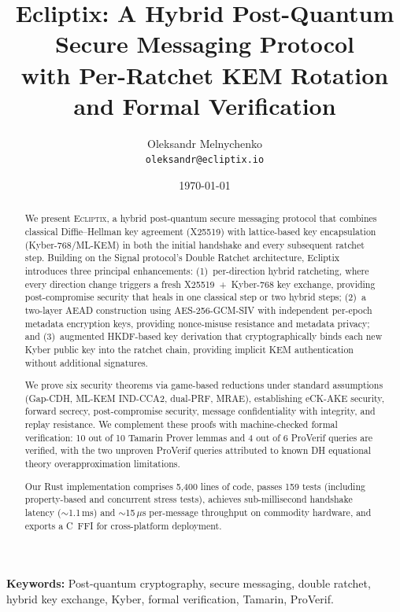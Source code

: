 \documentclass[11pt,a4paper]{article}
\title{\textbf{Ecliptix: A Hybrid Post-Quantum Secure Messaging Protocol\\with Per-Ratchet KEM Rotation and Formal Verification}}
\author{%
  Oleksandr Melnychenko\\
  \texttt{oleksandr@ecliptix.io}
}
\date{\today}
\theoremstyle{definition}
\begin{document}
\maketitle

\begin{abstract}
We present \textsc{Ecliptix}, a hybrid post-quantum secure messaging protocol that combines classical Diffie--Hellman key agreement (X25519) with lattice-based key encapsulation (Kyber-768/ML-KEM) in both the initial handshake and every subsequent ratchet step. Building on the Signal protocol's Double Ratchet architecture, Ecliptix introduces three principal enhancements: (1)~per-direction hybrid ratcheting, where every direction change triggers a fresh X25519~+~Kyber-768 key exchange, providing post-compromise security that heals in one classical step or two hybrid steps; (2)~a two-layer AEAD construction using AES-256-GCM-SIV with independent per-epoch metadata encryption keys, providing nonce-misuse resistance and metadata privacy; and (3)~augmented HKDF-based key derivation that cryptographically binds each new Kyber public key into the ratchet chain, providing implicit KEM authentication without additional signatures.

We prove six security theorems via game-based reductions under standard assumptions (Gap-CDH, ML-KEM IND-CCA2, dual-PRF, MRAE), establishing eCK-AKE security, forward secrecy, post-compromise security, message confidentiality with integrity, and replay resistance. We complement these proofs with machine-checked formal verification: 10 out of 10 Tamarin Prover lemmas and 4 out of 6 ProVerif queries are verified, with the two unproven ProVerif queries attributed to known DH equational theory overapproximation limitations.

Our Rust implementation comprises 5{,}400 lines of code, passes 159 tests (including property-based and concurrent stress tests), achieves sub-millisecond handshake latency ($\sim$1.1\,ms) and $\sim$15\,$\mu$s per-message throughput on commodity hardware, and exports a C~FFI for cross-platform deployment.
\end{abstract}

\smallskip
\noindent\textbf{Keywords:} Post-quantum cryptography, secure messaging, double ratchet, hybrid key exchange, Kyber, formal verification, Tamarin, ProVerif.

\tableofcontents
\newpage
\end{document}
